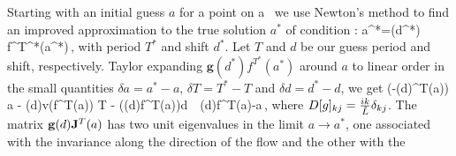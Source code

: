 Starting with an initial guess $a$ for a point on a \rpo\ we use Newton's method to find an improved approximation to the true solution $a^*$ of condition  :
\beq
	a^*=(d^*)  f^{T^*}(a^*)\,,
	\label{eq:RPOcond}
\eeq
with period $T^*$ and shift $d^*$. Let $T$ and $d$ be our guess period and shift, respectively. 
Taylor expanding $\mathbf{g}(d^*)  f^{T^*}(a^*)$ around $a$ to linear order in the small quantities 
$\delta a=a^*-a$, $\delta T=T^*-T$ and $\delta d=d^*-d$, we get
% 
% 
% 
\beq
	\left(-(d)\J^{T}(a)\right) \delta a - (d)v(f^{T}(a)) \delta T 
							- ((d)f^{T}(a))\delta d  
					\,\simeq\, (d)f^{T}(a)-a\,,
	\label{eq:NewtonBasicCond}			
\eeq
where $D[g]_{kj}=\frac{ik}{\tilde{L}}\delta_{kj}$. The matrix $\mathbf{g}(d)\mathbf{J}^{T}(a)$ has two unit eigenvalues in 
the limit $a\rightarrow a^*$, one associated with the invariance along the direction of the flow and the other with the
